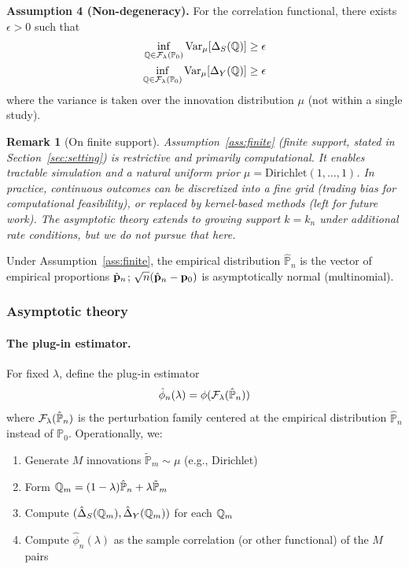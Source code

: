 \documentclass{article}
\newtheorem{remark}{Remark}
\newcommand{\PP}{\mathbb{P}}
\begin{document}
\noindent\textbf{Assumption 4 (Non-degeneracy).}\label{ass:nondegeneracy}
For the correlation functional, there exists $\epsilon > 0$ such that
\begin{align*}
    \inf_{\Q \in \cF_\lambda(\PP_0)} \Var_\mu[\Delta_S(\Q)] &\geq \epsilon\\
    \inf_{\Q \in \cF_\lambda(\PP_0)} \Var_\mu[\Delta_Y(\Q)] &\geq \epsilon
\end{align*}
where the variance is taken over the innovation distribution $\mu$
(not within a single study).

\begin{remark}[On finite support]
Assumption~\ref{ass:finite} (finite support, stated in Section~\ref{sec:setting}) is restrictive
and primarily computational. It enables tractable simulation and a natural uniform
prior $\mu = \text{Dirichlet}(1,\ldots,1)$. In practice, continuous outcomes can be
discretized into a fine grid (trading bias for computational feasibility), or
replaced by kernel-based methods (left for future work). The asymptotic theory
extends to growing support $k=k_n$ under additional rate conditions, but we do not
pursue that here.
\end{remark}

Under Assumption~\ref{ass:finite}, the empirical distribution $\hat{\PP}_n$ is the vector of empirical proportions $\hat{\mathbf{p}}_n$; $\sqrt{n}(\hat{\mathbf{p}}_n - \mathbf{p}_0)$ is asymptotically normal (multinomial).

\subsubsection{Asymptotic theory}

\paragraph{The plug-in estimator.}
For fixed $\lambda$, define the plug-in estimator
\[
    \hat{\phi}_n(\lambda) = \phi(\cF_\lambda(\hat{\PP}_n))
\]
where $\cF_\lambda(\hat{\PP}_n)$ is the perturbation family centered at the
empirical distribution $\hat{\PP}_n$ instead of $\PP_0$. Operationally, we:
\begin{enumerate}
    \item Generate $M$ innovations $\tilde{\PP}_m \sim \mu$ (e.g., Dirichlet)
    \item Form $\Q_m = (1-\lambda)\hat{\PP}_n + \lambda\tilde{\PP}_m$
    \item Compute $(\hat{\Delta}_S(\mathbb{Q}_m), \hat{\Delta}_Y(\mathbb{Q}_m))$ for each $\mathbb{Q}_m$
    \item Compute $\hat{\phi}_n(\lambda)$ as the sample correlation (or other functional)
          of the $M$ pairs
\end{enumerate}
\end{document}
